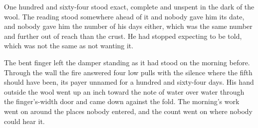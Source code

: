 One hundred and sixty-four stood exact, complete and unspent in the dark of the wool. The reading stood somewhere ahead of it and nobody gave him its date, and nobody gave him the number of his days either, which was the same number and further out of reach than the crust. He had stopped expecting to be told, which was not the same as not wanting it.

The bent finger left the damper standing as it had stood on the morning before. Through the wall the fire answered four low pulls with the silence where the fifth should have been, its payer unnamed for a hundred and sixty-four days. His hand outside the wool went up an inch toward the note of water over water through the finger's-width door and came down against the fold. The morning's work went on around the places nobody entered, and the count went on where nobody could hear it.
